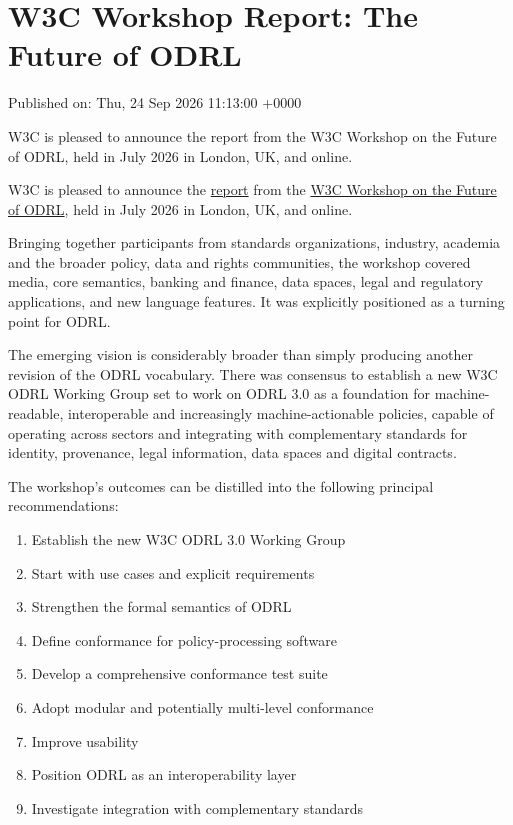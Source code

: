 \documentclass[11pt,a4paper]{article}
\begin{document}
\section{W3C Workshop Report: The Future of ODRL}

Published on: Thu, 24 Sep 2026 11:13:00 +0000

W3C is pleased to announce the report from the W3C Workshop on the Future of ODRL, held in July 2026 in London, UK, and online.

W3C is pleased to announce the \href{https://www.w3.org/2026/ODRLWS/report.html}{report} from the \href{https://www.w3.org/2026/ODRLWS/index.html}{W3C Workshop on the Future of ODRL}, held in July 2026 in London, UK, and online.

Bringing together participants from standards organizations, industry, academia and the broader policy, data and rights communities, the workshop covered media, core semantics, banking and finance, data spaces, legal and regulatory applications, and new language features. It was explicitly positioned as a turning point for ODRL.

The emerging vision is considerably broader than simply producing another revision of the ODRL vocabulary. There was consensus to establish a new W3C ODRL Working Group set to work on ODRL 3.0 as a foundation for machine-readable, interoperable and increasingly machine-actionable policies, capable of operating across sectors and integrating with complementary standards for identity, provenance, legal information, data spaces and digital contracts.

The workshop's outcomes can be distilled into the following principal recommendations:

\begin{enumerate}
\item Establish the new W3C ODRL 3.0 Working Group
\item Start with use cases and explicit requirements
\item Strengthen the formal semantics of ODRL
\item Define conformance for policy-processing software
\item Develop a comprehensive conformance test suite
\item Adopt modular and potentially multi-level conformance
\item Improve usability
\item Position ODRL as an interoperability layer
\item Investigate integration with complementary standards
\end{enumerate}
\end{document}
